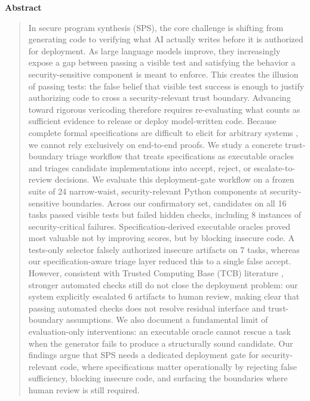 \documentclass[11pt]{article}
\begin{document}
\begin{center}
{\large\bfseries Abstract}
\end{center}
\vspace{0.12in}
\begin{quote}
In secure program synthesis (SPS), the core challenge is shifting from generating code to verifying what AI actually writes before it is authorized for deployment. As large language models improve, they increasingly expose a gap between passing a visible test and satisfying the behavior a security-sensitive component is meant to enforce. This creates the illusion of passing tests: the false belief that visible test success is enough to justify authorizing code to cross a security-relevant trust boundary. Advancing toward rigorous vericoding \cite{Bursuc2025Vericoding} therefore requires re-evaluating what counts as sufficient evidence to release or deploy model-written code. Because complete formal specifications are difficult to elicit for arbitrary systems \cite{Dodds2025Specs}, we cannot rely exclusively on end-to-end proofs. We study a concrete trust-boundary triage workflow that treats specifications as executable oracles \cite{Regehr2026ZeroDOF} and triages candidate implementations into accept, reject, or escalate-to-review decisions. We evaluate this deployment-gate workflow on a frozen suite of 24 narrow-waist, security-relevant Python components at security-sensitive boundaries. Across our confirmatory set, candidates on all 16 tasks passed visible tests but failed hidden checks, including 8 instances of security-critical failures. Specification-derived executable oracles proved most valuable not by improving scores, but by blocking insecure code. A tests-only selector falsely authorized insecure artifacts on 7 tasks, whereas our specification-aware triage layer reduced this to a single false accept. However, consistent with Trusted Computing Base (TCB) literature \cite{OathTech2026LeanTCB, Symbolic2026HighAssurance}, stronger automated checks still do not close the deployment problem: our system explicitly escalated 6 artifacts to human review, making clear that passing automated checks does not resolve residual interface and trust-boundary assumptions. We also document a fundamental limit of evaluation-only interventions: an executable oracle cannot rescue a task when the generator fails to produce a structurally sound candidate. Our findings argue that SPS needs a dedicated deployment gate for security-relevant code, where specifications matter operationally by rejecting false sufficiency, blocking insecure code, and surfacing the boundaries where human review is still required.
\end{quote}
\end{document}
